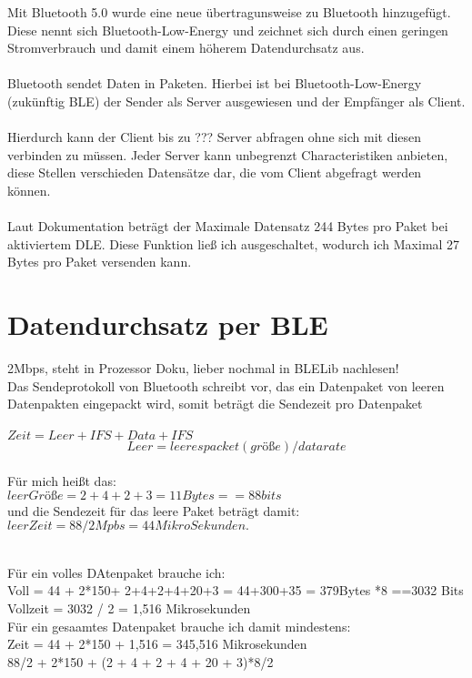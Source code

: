 Mit Bluetooth 5.0 wurde eine neue übertragunsweise zu 
Bluetooth hinzugefügt. Diese nennt sich Bluetooth-Low-Energy und zeichnet
sich durch einen geringen Stromverbrauch und damit einem höherem 
Datendurchsatz aus. \\
\\
Bluetooth sendet Daten in Paketen. Hierbei ist bei Bluetooth-Low-Energy
(zukünftig BLE) der Sender als Server ausgewiesen und der Empfänger als Client.\\
\\
Hierdurch kann der Client bis zu ??? Server abfragen ohne sich mit diesen 
verbinden zu müssen. Jeder Server kann unbegrenzt Characteristiken anbieten,
diese Stellen verschieden Datensätze dar, die vom Client abgefragt werden können.\\
\\
Laut Dokumentation beträgt der Maximale Datensatz 244 Bytes pro Paket bei 
aktiviertem DLE. Diese Funktion ließ ich ausgeschaltet, wodurch ich Maximal
27 Bytes pro Paket versenden kann. \\

\section{Datendurchsatz per BLE}
2Mbps, steht in Prozessor Doku, lieber nochmal in BLELib nachlesen!
\\
Das Sendeprotokoll von Bluetooth schreibt vor, das ein Datenpaket von
leeren Datenpakten eingepackt wird, somit beträgt die Sendezeit pro 
Datenpaket \\
\\
$
Zeit = Leer + IFS + Data + IFS
$
\\
\begin{equation}
Leer = leerespacket(größe) / datarate
\end{equation}
\\
Für mich heißt das:\\
$
leerGröße = 2 + 4 + 2 + 3 = 11 Bytes == 88 bits
$
\\
und die Sendezeit für das leere Paket beträgt damit:
\\
$
leerZeit = 88/2Mpbs = 44 Mikro Sekunden.
$

\\
Für ein volles DAtenpaket brauche ich:\\
Voll = 44 + 2*150+ 2+4+2+4+20+3 = 44+300+35 = 379Bytes *8 ==3032 Bits\\
Vollzeit = 3032 / 2 = 1,516 Mikrosekunden
\\
Für ein gesaamtes Datenpaket brauche ich damit mindestens:\\
Zeit = 44 + 2*150 + 1,516 = 345,516 Mikrosekunden
\\
88/2 + 2*150 + (2 + 4 + 2 + 4 + 20 + 3)*8/2

